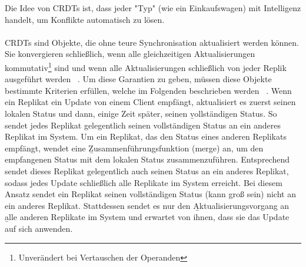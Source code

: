 %
%
%
%
%
Die Idee von \glspl{CRDT} ist, dass jeder "Typ" (wie ein Einkaufswagen) mit Intelligenz handelt, um Konflikte automatisch zu lösen.\\\\
CRDTs sind Objekte, die ohne teure Synchronisation aktualisiert werden können. Sie konvergieren schließlich, wenn alle gleichzeitigen Aktualisierungen kommutativ\footnote{Unverändert bei Vertauschen der Operanden} sind und wenn alle Aktualisierungen schließlich von jeder Replik ausgeführt werden ~\cite{crdt_shapiro}.
Um diese Garantien zu geben, müssen diese Objekte bestimmte Kriterien erfüllen, welche im Folgenden beschrieben werden ~\cite{crdt_shapiro2}.
Wenn ein Replikat ein Update von einem Client empfängt, aktualisiert es zuerst seinen lokalen Status und dann, einige Zeit später, seinen \b{vollständigen Status}. So sendet jedes Replikat gelegentlich seinen vollständigen Status an ein anderes Replikat im System. Um ein Replikat, das den Status eines anderen Replikats empfängt, wendet eine \b{Zusammenführungsfunktion} (merge) an, um den empfangenen Status mit dem lokalen Status zusammenzuführen. Entsprechend sendet dieses Replikat gelegentlich auch seinen Status an ein anderes Replikat, sodass jedes Update schließlich alle Replikate im System erreicht.
Bei diesem Ansatz sendet ein Replikat seinen vollständigen Status (kann groß sein) nicht an ein anderes Replikat. Stattdessen sendet es nur den \b{Aktualisierungsvorgang} an \b{alle} anderen Replikate im System und erwartet von ihnen, dass sie das Update auf sich anwenden.\\
